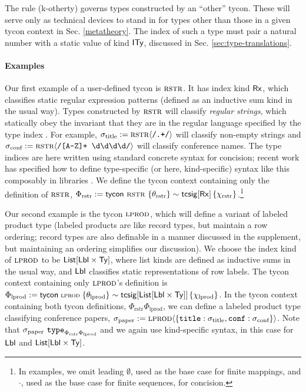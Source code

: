 \documentclass[10pt,preprint]{sigplanconf}
\begin{document}
The rule (k-otherty) governs types constructed by an ``other'' tycon. These will serve only as technical devices to stand in for types other than those in a given tycon context in Sec. \ref{metatheory}. The index of such a type must pair a natural number with a static value of kind ${\sf ITy}$, discussed in Sec. \ref{sec:type-translations}.




\paragraph{Examples}
Our first example of a user-defined tycon is $\textsc{rstr}$. It has index kind ${\sf Rx}$, which classifies static regular expression patterns (defined as an inductive sum kind in the usual way). Types constructed by $\textsc{rstr}$ will classify \emph{regular strings}, which statically obey the invariant that they are in the regular language specified by the type index \cite{sanitation-psp14}. For example, $\sigma_\text{title} := {\textsc{rstr}}\langle\texttt{/.+/}\rangle$ will classify non-empty strings and $\sigma_\text{conf} := {\textsc{rstr}}\langle\texttt{/[A-Z]+ \textbackslash d\textbackslash d\textbackslash d\textbackslash d/}\rangle$ will classify conference names.  The type indices are  here written using standard concrete syntax for concision; recent work has specified how to define type-specific (or here, kind-specific) syntax like this composably in libraries \cite{TSLs}. We define the tycon context containing only the definition of $\textsc{rstr}$, $\Phi_\text{rstr} := {\sf tycon}~\textsc{rstr} ~\{\theta_\text{rstr}\} \sim {\sf tcsig}[{\sf Rx}]\,\{\chi_\text{rstr}\}$.\footnote{In examples, we omit leading $\emptyset$, used as the base case for finite mappings, and $\cdot$, used as the base case for finite sequences, for concision. }

Our second example is the tycon $\textsc{lprod}$, which will define a variant of labeled product type (labeled products are like record types, but maintain a row  ordering; record types are also definable in a manner discussed in the supplement, but maintaining an ordering simplifies our discussion). We choose the index kind of $\textsc{lprod}$ to be ${\sf List}[{\sf Lbl} \times {\sf Ty}]$, where list kinds are defined as inductive sums in the usual way, and ${\sf Lbl}$ classifies static representations of row labels. The tycon context containing only $\textsc{lprod}$'s definition is $\small\Phi_\text{lprod} := \tcdef{\tcvar{lprod}}{\tcsig{\klist{\klbl \times \kty}}{\chi_\text{lprod}}}{\theta_\text{lprod}}$. In the tycon context containing both tycon definitions, $\Phi_\text{rstr}\Phi_\text{lprod}$, we can define a labeled product type classifying conference papers, $\sigma_\text{paper} := {\textsc{lprod}}\langle\{\texttt{title} : \sigma_\text{title}, \texttt{conf} : \sigma_\text{conf}\}\rangle$. Note that $\sigma_\text{paper}~\texttt{type}_{\Phi_\text{rstr}\Phi_\text{lprod}}$ and we again use kind-specific syntax, in this case for ${\sf Lbl}$ and ${\sf List}[{\sf Lbl} \times {\sf Ty}]$.
\end{document}
